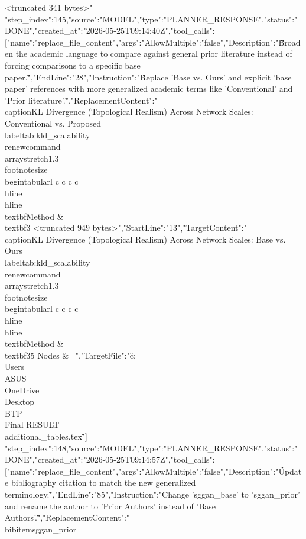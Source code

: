\begin{table}[t]
{\begin{table}[t]
{{{{{{{{{{{{<truncated 341 bytes>"}
{"step_index":145,"source":"MODEL","type":"PLANNER_RESPONSE","status":"DONE","created_at":"2026-05-25T09:14:40Z","tool_calls":[{"name":"replace_file_content","args":{"AllowMultiple":"false","Description":"\"Broaden the academic language to compare against general prior literature instead of forcing comparisons to a specific base paper.\"","EndLine":"28","Instruction":"\"Replace 'Base vs. Ours' and explicit 'base paper' references with more generalized academic terms like 'Conventional' and 'Prior literature'.\"","ReplacementContent":"\"\\caption{KL Divergence (Topological Realism) Across Network Scales: Conventional vs. Proposed}\
\\label{tab:kld_scalability}\
\\renewcommand{\\arraystretch}{1.3}\
\\footnotesize\
\\begin{tabular}{l c c c c}\
\\hline \\hline\
\\textbf{Method} & \\textbf{3
<truncated 949 bytes>","StartLine":"13","TargetContent":"\"\\caption{KL Divergence (Topological Realism) Across Network Scales: Base vs. Ours}\
\\label{tab:kld_scalability}\
\\renewcommand{\\arraystretch}{1.3}\
\\footnotesize\
\\begin{tabular}{l c c c c}\
\\hline \\hline\
\\textbf{Method} & \\textbf{35 Nodes} & \
<truncated 862 bytes>","TargetFile":"\"c:\\Users\\ASUS\\OneDrive\\Desktop\\BTP\\Final RESULT\\additional_tables.tex\""}}]}
{"step_index":148,"source":"MODEL","type":"PLANNER_RESPONSE","status":"DONE","created_at":"2026-05-25T09:14:57Z","tool_calls":[{"name":"replace_file_content","args":{"AllowMultiple":"false","Description":"\"Update bibliography citation to match the new generalized terminology.\"","EndLine":"85","Instruction":"\"Change 'sggan_base' to 'sggan_prior' and rename the author to 'Prior Authors' instead of 'Base Authors'.\"","ReplacementContent":"\"\\bibitem{sggan_prior}\
}}}}}}}}}}}}}}}
\end{table}}
\end{table}
